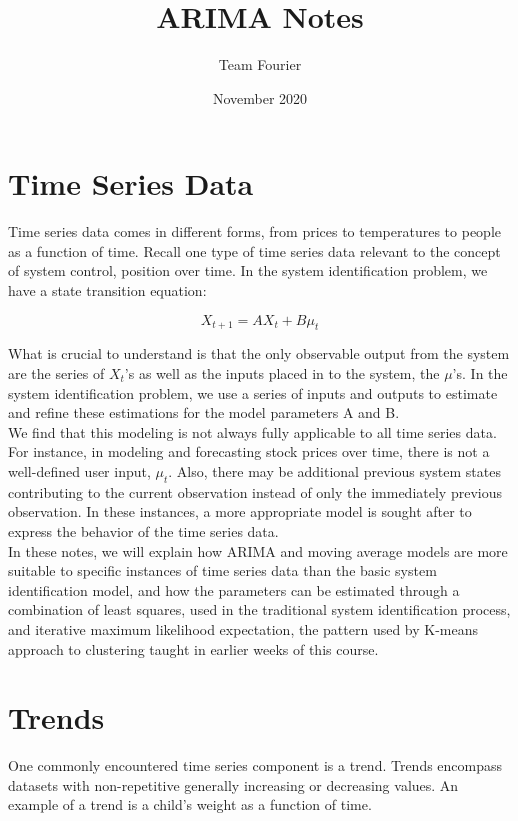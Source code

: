 \documentclass{article}
\title{ARIMA Notes}
\author{Team Fourier}
\date{November 2020}
\begin{document}
\maketitle
\section{Time Series Data}
Time series data comes in different forms, from prices to temperatures to people as a function of time. Recall one type of time series data relevant to the concept of system control, position over time. In the system identification problem, we have a state transition equation:

\begin{equation}\label{1}
X_{t+1} = AX_{t} + B\mu_{t}
\end{equation}

What is crucial to understand is that the only observable output from the system are the series of $X_{t}$'s as well as the inputs placed in to the system, the $\mu$'s. In the system identification problem, we use a series of inputs and outputs to estimate and refine these estimations for the model parameters A and B. \\

We find that this modeling is not always fully applicable to all time series data. For instance, in modeling and forecasting stock prices over time, there is not a well-defined user input, $\mu_{t}$. Also, there may be additional previous system states contributing to the current observation instead of only the immediately previous observation. In these instances, a more appropriate model is sought after to express the behavior of the time series data. \\

In these notes, we will explain how ARIMA and moving average models are more suitable to specific instances of time series data than the basic system identification model, and how the parameters can be estimated through a combination of least squares, used in the traditional system identification process, and iterative maximum likelihood expectation, the pattern used by K-means approach to clustering taught in earlier weeks of this course.

\maketitle
\section{Trends}
One commonly encountered time series component is a trend. Trends encompass datasets with non-repetitive generally increasing or decreasing values. An example of a trend is a child's weight as a function of time.
\end{document}
